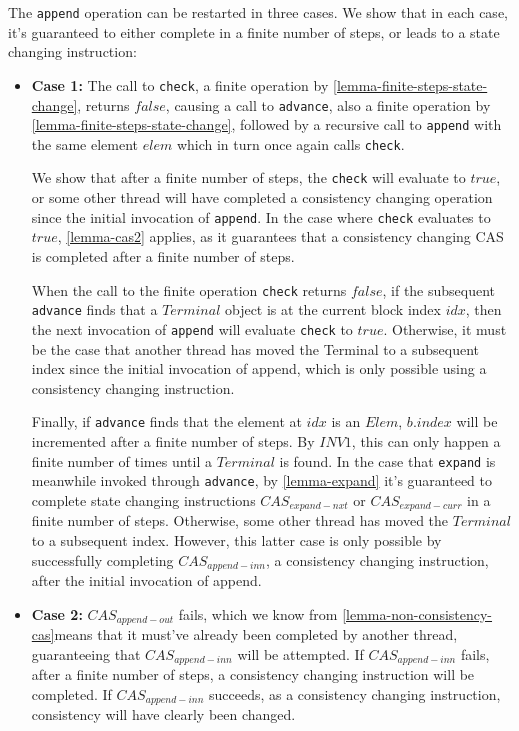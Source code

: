 \begin{prooftwo}
The \verb=append= operation can be restarted in three cases. We show that in
each case, it's guaranteed to either complete in a finite number of steps,  or
leads to a state changing instruction:

\begin{itemize}

\item \textbf{Case 1:} The call to \verb=check=, a finite operation by
\ref{lemma-finite-steps-state-change}, returns $false$,  causing a call to
\verb=advance=, also a finite operation by
\ref{lemma-finite-steps-state-change}, followed by a recursive call to
\verb=append= with the same element $elem$ which in turn once again calls
\verb=check=.

We show that after a finite number of steps, the \verb=check= will evaluate to
$true$, or some other thread will have completed a consistency changing
operation since the initial invocation of \verb=append=. In the case where
\verb=check= evaluates to $true$, \ref{lemma-cas2} applies, as it
guarantees that a consistency changing CAS is completed after a finite number
of steps.

When the call to the finite operation \verb=check= returns $false$, if the
subsequent \verb=advance= finds that a $Terminal$ object is at the current
block index $idx$, then the next invocation of \verb=append= will evaluate
\verb=check= to $true$. Otherwise, it must be the case that another thread has
moved the Terminal to a subsequent index since the initial invocation of
append, which is only possible using a consistency changing instruction.

Finally, if \verb=advance= finds that the element at $idx$ is an
$Elem$,
$b.index$ will be incremented after a finite number of steps. By
$INV1$, this can only happen a finite number of times until a $Terminal$ is
found. In the case that \verb=expand= is meanwhile invoked through
\verb=advance=, by \ref{lemma-expand} it's guaranteed to complete state
changing instructions $CAS_{expand-nxt}$ or $CAS_{expand-curr}$ in a finite
number of steps. Otherwise, some other thread has moved the $Terminal$ to a
subsequent index. However, this latter case is only possible by successfully
completing $CAS_{append-inn}$, a consistency changing instruction, after the
initial invocation of append.

\item \textbf{Case 2:} $CAS_{append-out}$ fails, which we know from
\ref{lemma-non-consistency-cas}means that it must've already been completed by
another thread, guaranteeing that $CAS_{append-inn}$ will be attempted. If
$CAS_{append-inn}$ fails,
after a finite number of steps, a
consistency changing instruction will be completed. If $CAS_{append-inn}$
succeeds, as a consistency changing instruction, consistency will have clearly
been changed.


\end{itemize}
\end{prooftwo}
